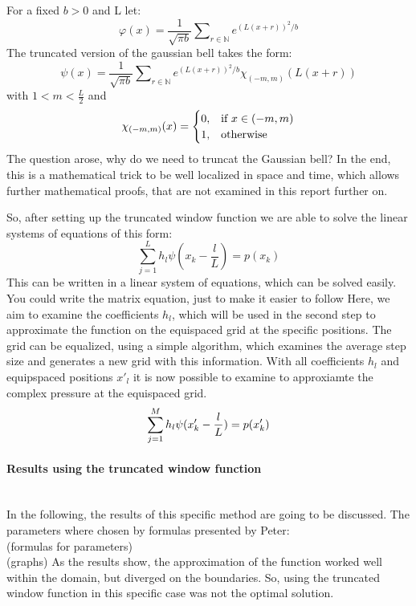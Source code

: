 \documentclass[11pt]{report} %
\begin{document}
For a fixed $b>0$ and L let:
\begin{equation}
\varphi(x)= \frac{1}{\sqrt{\pi b}} \sum\nolimits_{r \in \mathbb{N}}  e^{(L(x+r))^2/b}
\end{equation}
The truncated version of the gaussian bell takes the form: 
\begin{equation}
\psi(x)= \frac{1}{\sqrt{\pi b}} \sum\nolimits_{r \in \mathbb{N}}  e^{(L(x+r))^2/b}\chi_{(-m,m)}(L(x+r))
\end{equation}
with $1<m < \frac{L}{2}$ and
\begin{equation}
    \chi_{(-m,m)}(x)=
    \begin{cases}
      0, & \text{if}\ x\in (-m,m) \\
      1, & \text{otherwise}
    \end{cases}\notag
\end{equation} 
The question arose, why do we need to truncat the Gaussian bell? In the end, this is a mathematical trick to be well localized in space and time, which allows further mathematical proofs, that are not examined in this report further on.

So, after setting up the truncated window function we are able to solve the linear systems of equations of this form:
\begin{equation}
\sum\limits_{j=1}^L h_{l}\psi(x_{k}-\frac{l}{L})=p(x_{k})
\end{equation}
This can be written in a linear system of equations, which can be solved easily. {\color{red} You could write the matrix equation, just to make it easier to follow}
Here, we aim to examine the coefficients $h_{l}$, which will be used in the second step to approximate the function on the equispaced grid at the specific positions.
The grid can be equalized, using a simple algorithm, which examines the average step size and generates a new grid with this information.
With all coefficients $h_{l}$ and equipspaced positions $x'_{l}$ it is now possible to examine to approxiamte the complex pressure at the equispaced grid. 
\begin{equation}
 \sum\limits_{j=1}^M h_{l}\psi(x'_{k}-\frac{l}{L})=p(x'_{k})\notag
\end{equation}

\paragraph{Results using the truncated window function} $ $ \\[1ex]
In the following, the results of this specific method are going to be discussed.
The parameters where chosen by formulas presented by Peter: \\
	(formulas for parameters) \\
	(graphs)
As the results show, the approximation of the function worked well within the domain, but diverged on the boundaries.
So, using the truncated window function in this specific case was not the optimal solution. \\[1ex]
\end{document}
